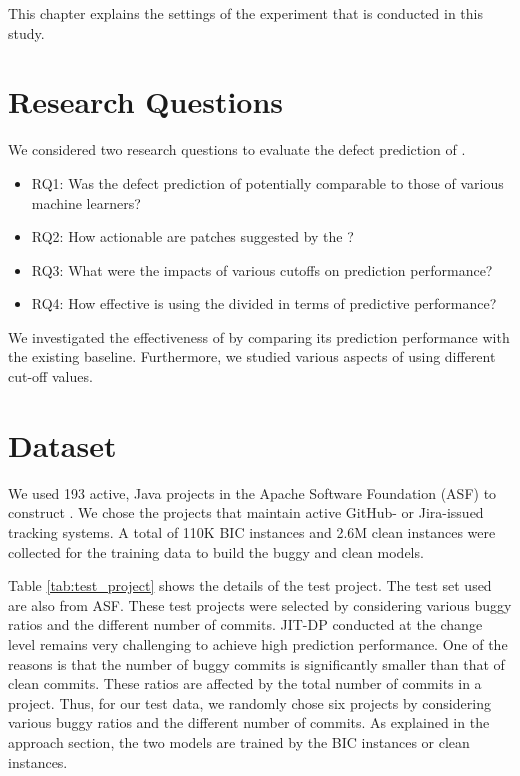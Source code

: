 This chapter explains the settings of the experiment that is conducted in this study.

\section{Research Questions}
We considered two research questions to evaluate the defect prediction of {\simfinmo}.

\begin{itemize}
    \item RQ1: Was the defect prediction of {\simfinmo} potentially comparable to those of various machine learners?
    \item RQ2: How actionable are patches suggested by the {\simfinmo}?
    \item RQ3: What were the impacts of various {\simfinmo} cutoffs on prediction performance?
    \item RQ4: How effective is using the divided {\simfin} in terms of predictive performance?
\end{itemize}

We investigated the effectiveness of {\simfinmo} by comparing its prediction performance with the existing baseline.
Furthermore, we studied various aspects of {\simfinmo} using different cut-off values.

\section{Dataset}
We used 193 active, Java projects in the Apache Software Foundation (ASF) to construct {\simfin}.
We chose the projects that maintain active GitHub- or Jira-issued tracking systems.
A total of 110K BIC instances and 2.6M clean instances were collected for the training data to build the buggy and clean {\simfin} models.

Table \ref{tab:test_project} shows the details of the test project.
The test set used are also from ASF.
These test projects were selected by considering various buggy ratios and the different number of commits.
JIT-DP conducted at the change level remains very challenging to achieve high prediction performance.
One of the reasons is that the number of buggy commits is significantly smaller than that of clean commits.
These ratios are affected by the total number of commits in a project.
Thus, for our test data, we randomly chose six projects by considering various buggy ratios and the different number of commits.
As explained in the approach section, the two {\simfin} models are trained by the BIC instances or clean instances.

